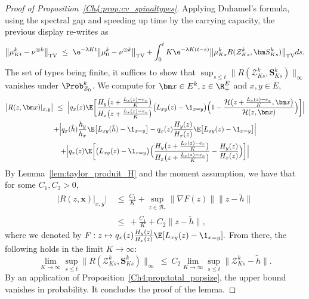 \begin{refsegment}
\begin{proof}[Proof of Proposition~\ref{Ch4:prop:cv_spinaltypes}]
Applying Duhamel's formula, using the spectral gap and speeding up time by the carrying capacity, the previous display re-writes as
\[
\big\lVert \mu^k_{Kt} - \nu^{\otimes k} \big\rVert_{\mathrm{TV}} \ \leq\ \e^{-\lambda K t}\big\lVert \mu^k_0 - \nu^{\otimes k}\big\rVert_{\mathrm{TV}} + \int_0^t K\e^{-\lambda K(t-s)}\big\lVert \mu^k_{Ks} R(\mathcal{Z}^k_{Ks}, \bm S^k_{Ks}) \big\rVert_{\mathrm{TV}} ds.
\]
The set of types being finite, it suffices to show that
$\sup_{s\leq t}  \lVert R(\mathcal{Z}^k_{Ks}, \bm S^k_{Ks})\rVert_\infty$ vanishes under $\Prob^k_{Z_0}$.
We compute for $\bm x\in E^k, z\in \R_+^E$ and $x,y\in E$,
\begin{multline*}
  \big| R(z,\bm x)|_{x, y}\big| \  \leq\ 
\Big| q_x(z)    \E\bigg[\frac{H_y\big(z+\frac{L_x(z)-e_{x}}{K}\big)}{H_x\big(z+\frac{L_x(z)-e_{x}}{K}\big)} \big(L_{xy}(z)-\1_{x=y}\big)\Big(1-\frac{\mathcal{H}\big(z+ \frac{L_x(z)-e_{x}}{K}, \bm x\big)}{\mathcal{H}(z,\bm x)}\Big)\bigg] \Big| \\
   + \Big| q_x(\tilde h)\frac{h_y}{h_x} \E\big[L_{xy}(\tilde h)-\1_{x=y}\big]- q_x(z)\frac{H_y(z)}{H_x(z)} \E\big[L_{xy}(z)-\1_{x=y}\big]\Big| \\
   + \Big| q_x(z) \E\bigg[\big(L_{xy}(z)-\1_{x=y}\big)\Big(\frac{H_y\big(z+\frac{L_x(z)-e_x}{K}\big)}{H_x\big(z+ \frac{L_x(z)-e_x}{K}\big)}-\frac{H_y(z)}{H_x(z)}\Big)\bigg]\Big|
\end{multline*}
By Lemma~\ref{lem:taylor_produit_H} and the moment assumption, we have that for some $C_1,C_2>0$,
\begin{align*}
\big| R(z,\bm x)|_{x, y}\big| \ &\leq\  \frac{C_1}{K} +
  \sup_{z\in \mathscr{B}_\gamma}\lVert \nabla F(z)\rVert\lVert z -\tilde h\rVert \\
&\leq\ + \frac{C_1}{K} + C_2 \lVert z -\tilde h\rVert,
\end{align*}
where we denoted by $F:z\mapsto q_x(z)\frac{H_y(z)}{H_x(z)} \E[L_{xy}(z)-\1_{x=y}].$
From there, the following holds in the limit $K\to\infty$:
\[ 
\lim_{K\to\infty}\sup_{s\leq t} \big\lVert R(\mathcal{Z}^k_{Ks},\bm S^k_{Ks})\big\rVert_\infty \ \leq\  C_2 \lim_{K\to\infty} \sup_{s\leq t}\big\lVert \mathcal{Z}^k_{Ks} -\tilde h\big\rVert.
\]
By an application of Proposition~\ref{Ch4:prop:total_popsize}, the upper bound vanishes in probability. It concludes the proof of the lemma.
\end{proof}



\end{refsegment}
